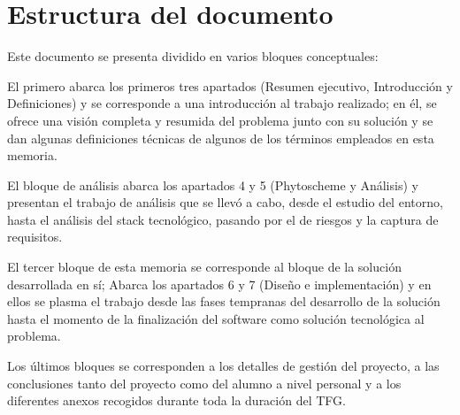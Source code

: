 \section{Estructura del documento}
	
Este documento se presenta dividido en varios bloques conceptuales: \par
El primero abarca los primeros tres apartados (Resumen ejecutivo, Introducción  y Definiciones) y se corresponde a una introducción al trabajo realizado; en él, se ofrece una visión completa y resumida del problema junto con su solución y se dan algunas definiciones técnicas de algunos de los términos empleados en esta memoria. \par
El bloque de análisis abarca los apartados 4 y 5 (Phytoscheme y Análisis) y presentan el trabajo de análisis que se llevó a cabo, desde el estudio del entorno, hasta el análisis del stack tecnológico, pasando por el de riesgos y la captura de requisitos. \par 
El tercer bloque de esta memoria se corresponde al bloque de la solución desarrollada en sí; Abarca los apartados 6 y 7 (Diseño e implementación) y en ellos se plasma el trabajo desde las fases tempranas del desarrollo de la solución hasta el momento de la finalización del software como solución tecnológica al problema. \par
Los últimos bloques se corresponden a los detalles de gestión del proyecto, a las conclusiones tanto del proyecto como del alumno a nivel personal y a los diferentes anexos recogidos durante toda la duración del TFG.
